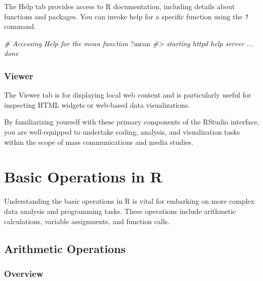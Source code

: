 \documentclass[
]{book}
\newenvironment{Shaded}{\begin{snugshade}}{\end{snugshade}}
\newcommand{\CommentTok}[1]{\textcolor[rgb]{0.56,0.35,0.01}{\textit{#1}}}
\newcommand{\NormalTok}[1]{#1}
\begin{document}
The Help tab provides access to R documentation, including details about functions and packages. You can invoke help for a specific function using the \texttt{?} command.

\begin{Shaded}
\begin{Highlighting}[]
\CommentTok{\# Accessing Help for the \textquotesingle{}mean\textquotesingle{} function}
\NormalTok{?mean}
\CommentTok{\#\textgreater{} starting httpd help server ... done}
\end{Highlighting}
\end{Shaded}

\hypertarget{viewer}{%
\subsubsection*{Viewer}\label{viewer}}

The Viewer tab is for displaying local web content and is particularly useful for inspecting HTML widgets or web-based data visualizations.

By familiarizing yourself with these primary components of the RStudio interface, you are well-equipped to undertake coding, analysis, and visualization tasks within the scope of mass communications and media studies.

\hypertarget{basic-operations-in-r}{%
\section{Basic Operations in R}\label{basic-operations-in-r}}

Understanding the basic operations in R is vital for embarking on more complex data analysis and programming tasks. These operations include arithmetic calculations, variable assignments, and function calls.

\hypertarget{arithmetic-operations}{%
\subsection*{Arithmetic Operations}\label{arithmetic-operations}}

\hypertarget{overview-1}{%
\subsubsection*{Overview}\label{overview-1}}
\end{document}
